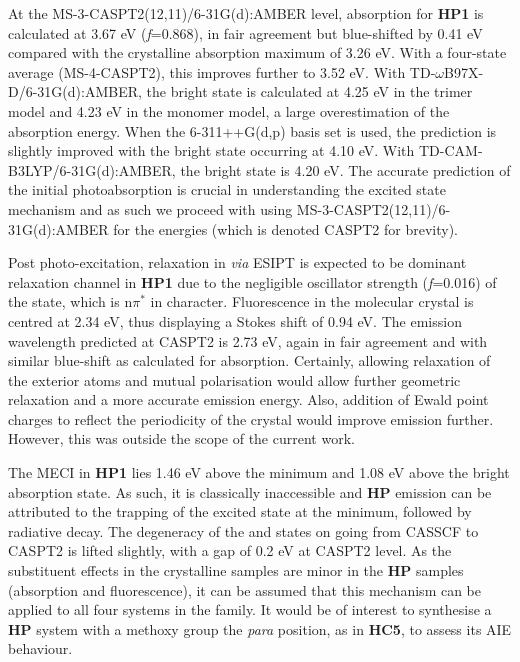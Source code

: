 At the MS-3-CASPT2(12,11)/6-31G(d):AMBER level, absorption for \textbf{HP1} is calculated at 3.67 eV (\textit{f}=0.868), in fair agreement but blue-shifted by 0.41 eV compared with the crystalline absorption maximum of 3.26 eV.\cite{Tang2016} 
With a four-state average (MS-4-CASPT2), this improves further to 3.52 eV. With TD-$\omega$B97X-D/6-31G(d):AMBER, the bright state is calculated at 4.25 eV in the trimer model and 4.23 eV in the monomer model, a large overestimation of the absorption energy. When the 6-311++G(d,p) basis set is used, the prediction is slightly improved with the bright state occurring at 4.10 eV. With TD-CAM-B3LYP/6-31G(d):AMBER, the bright state is 4.20 eV. The accurate prediction of the initial photoabsorption is crucial in understanding the excited state mechanism and as such we proceed with using MS-3-CASPT2(12,11)/6-31G(d):AMBER for the energies (which is denoted CASPT2 for brevity). %

Post photo-excitation, relaxation in \sone{} \textit{via}  ESIPT is expected to be dominant relaxation channel in \textbf{HP1} due to the negligible oscillator strength (\textit{f}=0.016) of the \stwo{} state, which is n$\pi^\ast{}$ in character. Fluorescence in the molecular crystal is centred at 2.34 eV, thus displaying a Stokes shift of 0.94 eV. The emission wavelength predicted at CASPT2 is 2.73 eV, again in fair agreement and with similar blue-shift as calculated for absorption. Certainly, allowing relaxation of the exterior atoms and mutual polarisation would allow further geometric relaxation and a more accurate emission energy. Also, addition of Ewald point charges to reflect the periodicity of the crystal would improve emission further. However, this was outside the scope of the current work.

The MECI in \textbf{HP1} lies 1.46 eV above the \Kstar{} minimum and 1.08 eV above the bright absorption state. As such, it is classically inaccessible and \textbf{HP} emission can be attributed to the trapping of the excited state at the \Kstar{} minimum, followed by radiative decay. The degeneracy of the \sone{} and \szero{} states on going from CASSCF to CASPT2 is lifted slightly, with a gap of 0.2 eV at CASPT2 level. As the substituent effects in the crystalline samples are minor in the \textbf{HP} samples (absorption and fluorescence), it can be assumed that this mechanism can be applied to all four systems in the family. It would be of interest to synthesise a \textbf{HP} system with a methoxy group the \textit{para} position, as in \textbf{HC5}, to assess its AIE behaviour.

